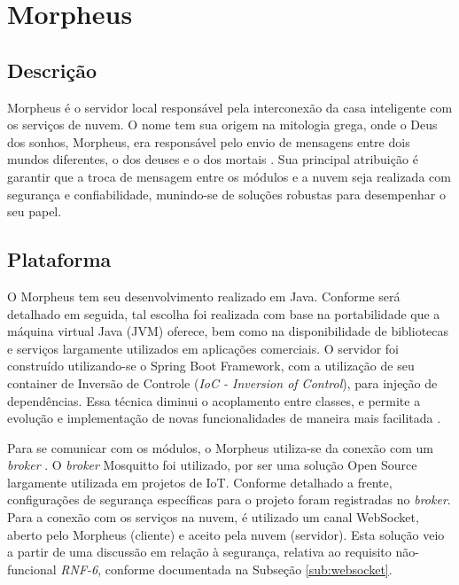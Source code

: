 \section{Morpheus \label{chap:morpheus}}

\subsection{Descrição}
Morpheus é o servidor local responsável pela interconexão da casa inteligente com os serviços de nuvem. O nome tem sua origem na mitologia grega, onde o Deus dos sonhos, Morpheus, era responsável pelo envio de mensagens entre dois mundos diferentes, o dos deuses e o dos mortais \cite{morpheusName}. Sua principal atribuição é garantir que a troca de mensagem entre os módulos e a nuvem seja realizada com segurança e confiabilidade, munindo-se de soluções robustas para desempenhar o seu papel.

\subsection{Plataforma}
O Morpheus tem seu desenvolvimento realizado em Java. Conforme será detalhado em seguida, tal escolha foi realizada com base na portabilidade que a máquina virtual Java (JVM) oferece, bem como na disponibilidade de bibliotecas e serviços largamente utilizados em aplicações comerciais. O servidor foi construído utilizando-se o Spring Boot Framework, com a utilização de seu container de Inversão de Controle (\emph{IoC - Inversion of Control}), para injeção de dependências. Essa técnica diminui o acoplamento entre classes, e permite a evolução e implementação de novas funcionalidades de maneira mais facilitada \cite{iocFowler}.

Para se comunicar com os módulos, o Morpheus utiliza-se da conexão com um \emph{broker} \wmqtt{}. O \emph{broker} Mosquitto foi utilizado, por ser uma solução Open Source largamente utilizada em projetos de IoT. Conforme detalhado a frente, configurações de segurança específicas para o projeto foram registradas no \emph{broker}. Para a conexão com os serviços na nuvem, é utilizado um canal WebSocket, aberto pelo Morpheus (cliente) e aceito pela nuvem (servidor). Esta solução veio a partir de uma discussão em relação à segurança, relativa ao requisito não-funcional \emph{RNF-6}, conforme documentada na Subseção \ref{sub:websocket}.

